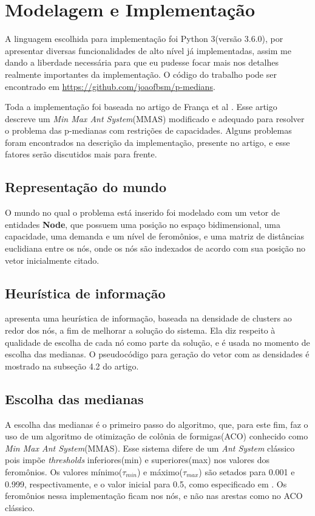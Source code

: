 \section{Modelagem e Implementação}

A linguagem escolhida para implementação foi Python 3(versão 3.6.0), por apresentar diversas funcionalidades de alto nível já implementadas, assim me dando a liberdade necessária para que eu pudesse focar mais nos detalhes realmente importantes da implementação. O código do trabalho pode ser encontrado em \url{https://github.com/joaofbsm/p-medians}. 

Toda a implementação foi baseada no artigo de França et al \cite{de2005max}. Esse artigo descreve um \textit{Min Max Ant System}(MMAS) modificado e adequado para resolver o problema das p-medianas com restrições de capacidades. Alguns problemas foram encontrados na descrição da implementação, presente no artigo, e esse fatores serão discutidos mais para frente. 

\subsection{Representação do mundo}

O mundo no qual o problema está inserido foi modelado com um vetor de entidades \textbf{Node}, que possuem uma posição no espaço bidimensional, uma capacidade, uma demanda e um nível de feromônios, e uma matriz de distâncias euclidiana entre os nós, onde os nós são indexados de acordo com sua posição no vetor inicialmente citado. 

\subsection{Heurística de informação}

\cite{de2005max} apresenta uma heurística de informação, baseada na densidade de clusters ao redor dos nós, a fim de melhorar a solução do sistema. Ela diz respeito à qualidade de escolha de cada nó como parte da solução, e é usada no momento de escolha das medianas. O pseudocódigo para geração do vetor com as densidades é mostrado na subseção 4.2 do artigo.

\subsection{Escolha das medianas}

A escolha das medianas é o primeiro passo do algoritmo, que, para este fim, faz o uso de um algoritmo de otimização de colônia de formigas(ACO) conhecido como \textit{Min Max Ant System}(MMAS). Esse sistema difere de um \textit{Ant System} clássico pois impõe \textit{thresholds} inferiores(min) e superiores(max) nos valores dos feromônios. Os valores mínimo($\tau_{min}$) e máximo($\tau_{max}$) são setados para 0.001 e 0.999, respectivamente, e o valor inicial para 0.5, como especificado em \cite{de2005max}. Os feromônios nessa implementação ficam nos nós, e não nas arestas como no ACO clássico.

